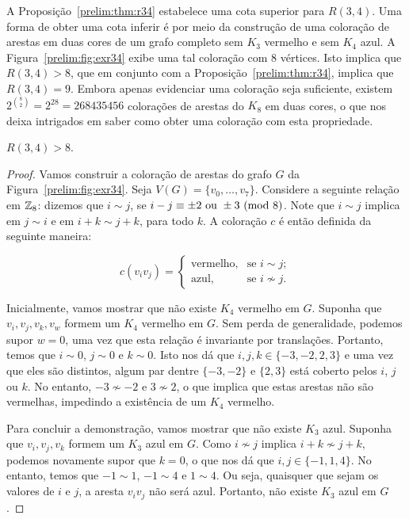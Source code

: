 A Proposição~\ref{prelim:thm:r34} estabelece uma cota superior para $R(3,4)$. Uma forma de obter uma cota inferir é por meio da construção de uma coloração de arestas em duas cores de um grafo completo sem $K_3$ vermelho e sem $K_4$ azul.
A Figura~\ref{prelim:fig:exr34} exibe uma tal coloração com 8 vértices. Isto implica que $R(3,4) > 8$, que em conjunto com a Proposição~\ref{prelim:thm:r34}, implica que $R(3,4) = 9$. Embora apenas evidenciar uma coloração seja suficiente, existem $2^{\binom{8}{2}} = 2^{28} = 268435456$ colorações de arestas do $K_8$ em duas cores, o que nos deixa intrigados em saber como obter uma coloração com esta propriedade.

\begin{proposition}
\label{prelim:thm:exr34}
$R(3,4) > 8$.
\end{proposition}
\begin{proof}
Vamos construir a coloração de arestas do grafo $G$ da Figura~\ref{prelim:fig:exr34}. Seja $V(G) = \{ v_0, \dots, v_7 \}$. Considere a  seguinte relação em $\mathbb{Z}_{8}$: dizemos que $i \sim j$, se $ i - j \equiv \pm 2 \text{ ou } \pm 3 \ (\text{mod}\ 8)$.
Note que $i \sim j$ implica em $ j \sim i$ e em $i + k \sim j + k$, para todo $k$. A coloração $c$ é então definida da seguinte maneira:

\[c(v_i v_j) = \begin{cases}
  \text{vermelho}, & \text{se } i \sim j; \\
  \text{azul}, & \text{se } i \not\sim j.
\end{cases}\]

Inicialmente, vamos mostrar que não existe $K_4$ vermelho em $G$. Suponha que $v_i, v_j, v_k, v_w$ formem um $K_4$ vermelho em $G$. Sem perda de generalidade, podemos supor $w = 0$, uma vez que esta relação é invariante por translações. Portanto, temos que $i \sim 0$, $j \sim 0$ e $k \sim 0$. Isto nos dá que $i,j,k \in \{-3,-2,2,3\}$ e uma vez que eles são distintos, algum par dentre $\{-3,-2\}$ e $\{2,3\}$ está coberto pelos $i$, $j$ ou $k$.
No entanto, $-3 \not\sim -2$ e $3 \not\sim 2$, o que implica que estas arestas não são vermelhas, impedindo a existência de um $K_4$ vermelho.

Para concluir a demonstração, vamos mostrar que não existe $K_3$ azul. Suponha que $v_i, v_j, v_k$ formem um $K_3$ azul em $G$. Como $i \not\sim j$ implica $i + k \not\sim j + k$, podemos novamente supor que $k = 0$, o que nos dá que $i,j \in \{-1,1,4\}$.
No entanto, temos que $-1 \sim 1$, $-1 \sim 4$ e $1 \sim 4$. Ou seja, quaisquer que sejam os valores de $i$ e $j$, a aresta $v_iv_j$ não será azul. Portanto, não existe $K_3$ azul em $G$.
\end{proof}

